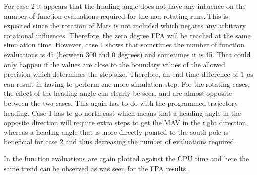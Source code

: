 \noindent
For case 2 it appears that the heading angle does not have any influence on the number of function evaluations required for the non-rotating runs. This is expected since the rotation of Mars is not included which negates any arbitrary rotational influences. Therefore, the zero degree \ac{FPA} will be reached at the same simulation time. However, case 1 shows that sometimes the number of function evaluations is 46 (between 300 and 0 degrees) and sometimes it is 45. That could only happen if the values are close to the boundary values of the allowed precision which determines the step-size. Therefore, an end time difference of 1 $\mu$s can result in having to perform one more simulation step. 
For the rotating cases, the effect of the heading angle can clearly be seen, and are almost opposite between the two cases. This again has to do with the programmed trajectory heading. Case 1 has to go north-east which means that a heading angle in the opposite direction will require extra steps to get the \ac{MAV} in the right direction, whereas a heading angle that is more directly pointed to the south pole is beneficial for case 2 and thus decreasing the number of evaluations required.

In  the function evaluations are again plotted against the CPU time and here the same trend can be observed as was seen for the \ac{FPA} results.



